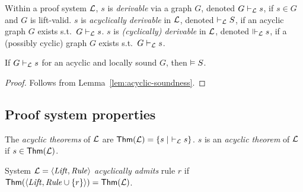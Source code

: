\newcommand{\DERby}[2]{\DER_{#1}{#2}}

\newcommand{\deracyc}{%
    \Vdash
}

\begin{definition}
    Within a proof system $\mathcal{L}$,
    $s$ is \emph{derivable} via a graph $G$, 
    denoted $G \vdash_{\mathcal{L}} s$,
    if $s \in G$ and $G$ is lift-valid.
    $s$ is \emph{acyclically derivable} in $\mathcal{L}$, denoted $\vdash_{\mathcal{L}} S$,
    if an acyclic graph $G$ exists s.t.\ 
    $G \vdash_{\mathcal{L}} s$.
    $s$ is \emph{(cyclically) derivable} in $\mathcal{L}$, denoted $\deracyc_\proofsysname s$,
    if a (possibly cyclic) graph $G$ exists s.t.\ 
    $G \vdash_{\mathcal{L}} s$.
\end{definition}

\begin{theorem}
    If $G \vdash_{\mathcal{L}} s$
    for an acyclic and locally sound $G$,
    then $\vDash S$.
\end{theorem}

\begin{proof}
    Follows from Lemma~\ref{lem:acyclic-soundness}.
\end{proof}

\subsection{Proof system properties}


\newcommand{\thmsacyc}[1]{
    \mathsf{Thm}\mathopen{}\left(#1\right)\mathclose{}
}

\begin{definition}
    The \emph{acyclic theorems} of $\mathcal{L}$ are
    $\thmsacyc{\proofsysname} = \SetBuild(s | 
    \ \vdash_\proofsysname s)$.
    $s$ is an \emph{acyclic theorem} of $\mathcal{L}$
    if $s \in \thmsacyc{\proofsysname}$.
\end{definition}

\begin{definition}
    System $\mathcal{L} = \left\langle \mathit{Lift}, \mathit{Rule}\right\rangle$ 
    \emph{acyclically admits} rule $r$ if
    $\thmsacyc{\proofsys\DomLiftable{\DomRule \cup \set{r}}} = \thmsacyc{\proofsysname}$.
\end{definition}


